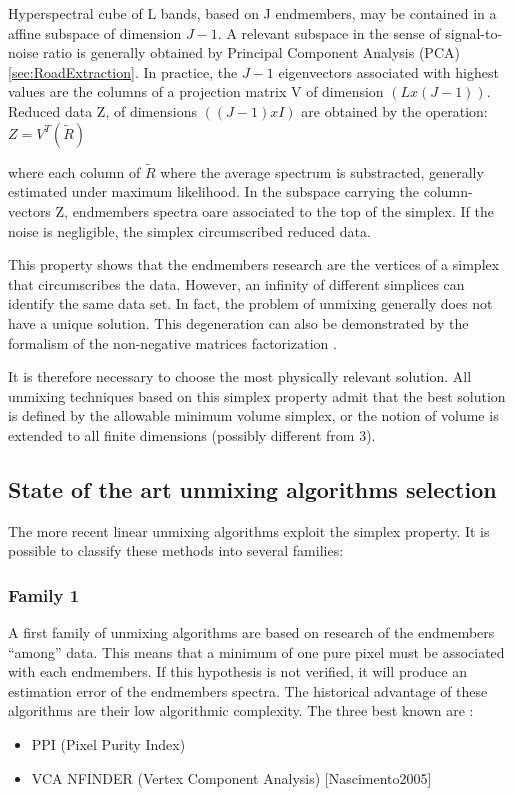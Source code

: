 Hyperspectral cube of L bands, based on J endmembers,
may be contained in a affine subspace of dimension $J-1$.
A relevant subspace in the sense of signal-to-noise ratio is
generally obtained by Principal Component Analysis (PCA) \ref{sec:RoadExtraction}. 
In practice, the $J-1$ eigenvectors associated with highest values are
the columns of a projection matrix V of dimension $(Lx(J-1))$. Reduced
data Z, of dimensions $((J-1)xI)$ are obtained by the operation:
$Z=V^{T}(\tilde{R})$

where each column of $\tilde{R}$ where the average spectrum is substracted,
generally estimated under maximum likelihood. In the
subspace carrying the column-vectors Z, endmembers spectra oare associated to the top of the simplex. If the noise is
negligible, the simplex circumscribed reduced data.

This property shows that the endmembers research are the vertices of a
simplex that circumscribes the data. However, an infinity of different
simplices can identify the same data set. In fact, the problem of
unmixing generally does not have a unique solution. This degeneration can also be
demonstrated by the formalism of the non-negative
matrices factorization \cite{Huck2010a}.

It is therefore necessary to choose the most physically
relevant solution. All unmixing techniques based on this simplex property admit that the best solution is defined by the allowable
minimum volume simplex, or the notion of volume is extended to all
finite dimensions (possibly different from 3).
  

\subsection{State of the art unmixing algorithms selection} 
The more recent linear unmixing algorithms exploit the
simplex property. It is possible to classify these methods into several families:

\subsubsection{Family 1} 
A first family of unmixing algorithms are based on research of the
endmembers ``among'' data. This means that a minimum of one pure pixel must
be associated with each endmembers. If this hypothesis is not
verified, it will produce an estimation error of the endmembers spectra. The historical advantage of these algorithms are their low
algorithmic complexity. The three best known are :
\begin{itemize}
\item PPI (Pixel Purity Index)
\item VCA NFINDER (Vertex Component Analysis) [Nascimento2005]
\end{itemize}

